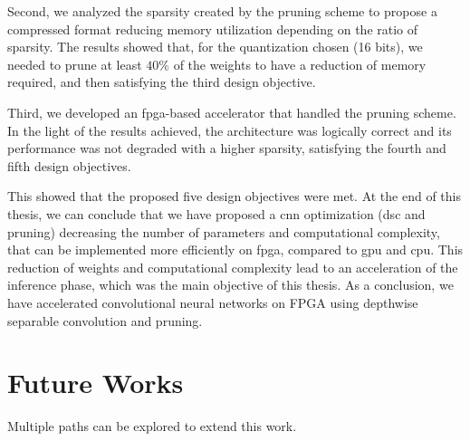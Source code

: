 Second, we analyzed the sparsity created by the pruning scheme to propose a compressed format reducing memory utilization depending on the ratio of sparsity. The results showed that, for the quantization chosen (16 bits), we needed to prune at least $40 \%$ of the weights to have a reduction of memory required, and then satisfying the third design objective. 

Third, we developed an \acrshort{fpga}-based accelerator that handled the pruning scheme. In the light of the results achieved, the architecture was logically correct and its performance was not degraded with a higher sparsity, satisfying the fourth and fifth design objectives.

This showed that the proposed five design objectives were met. At the end of this thesis, we can conclude that we have proposed a \acrshort{cnn} optimization (\acrshort{dsc} and pruning) decreasing the number of parameters and computational complexity, that can be implemented more efficiently on \acrshort{fpga}, compared to \acrshort{gpu} and \acrshort{cpu}. This reduction of weights and computational complexity lead to an acceleration of the inference phase, which was the main objective of this thesis. As a conclusion, we have accelerated convolutional neural networks on FPGA using depthwise separable convolution and pruning.
%
\section*{Future Works}
%
Multiple paths can be explored to extend this work.


